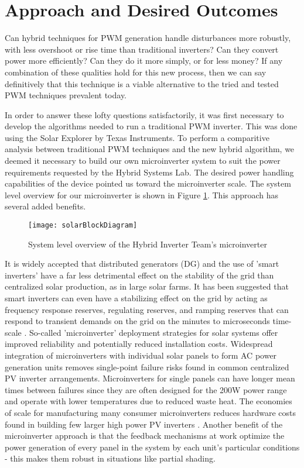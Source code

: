 \section{Approach and Desired Outcomes}
Can hybrid techniques for PWM generation handle disturbances more robustly, with less overshoot or rise time than traditional inverters? Can they convert power more efficiently? Can they do it more simply, or for less money? If any combination of these qualities hold for this new process, then we can say definitively that this technique is a viable alternative to the tried and tested PWM techniques prevalent today.

In order to answer these lofty questions satisfactorily, it was first necessary to develop the algorithms needed to run a traditional PWM inverter. This was done using the Solar Explorer by Texas Instruments. To perform a comparitive analysis between traditional PWM techniques and the new hybrid algorithm, we deemed it necessary to build our own microinverter system to suit the power requirements requested by the Hybrid Systems Lab. The desired power handling capabilities of the device pointed us toward the microinverter scale. The system level overview for our microinverter is shown in Figure \ref{solarBlock}. This approach has several added benefits.

\begin{figure}[h]
\centering
\texttt{[image: solarBlockDiagram]}
\caption{System level overview of the Hybrid Inverter Team's microinverter}
\label{solarBlock}
\end{figure}

It is widely accepted that distributed generators (DG) and the use of 'smart inverters' have a far less detrimental effect on the stability of the grid than centralized solar production, as in large solar farms. It has been suggested that smart inverters can even have a stabilizing effect on the grid by acting as frequency response reserves, regulating reserves, and ramping reserves that can respond to transient demands on the grid on the minutes to microseconds time-scale \cite{futureGrid}. So-called 'microinverter' deployment strategies for solar systems offer improved reliability and potentially reduced installation costs. Widespread integration of microinverters with individual solar panels to form AC power generation units removes single-point failure risks found in common centralized PV inverter arrangements. Microinverters for single panels can have longer mean times between failures since they are often designed for the 200W power range and operate with lower temperatures due to reduced waste heat. The economies of scale for manufacturing many consumer microinverters reduces hardware costs found in building few larger high power PV inverters \cite{microchip}. Another benefit of the microinverter approach is that the feedback mechanisms at work optimize the power generation of every panel in the system by each unit's particular conditions - this makes them robust in situations like partial shading.

